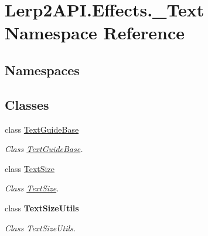 \hypertarget{namespace_lerp2_a_p_i_1_1_effects_1_1___text}{}\section{Lerp2\+A\+P\+I.\+Effects.\+\_\+\+Text Namespace Reference}
\label{namespace_lerp2_a_p_i_1_1_effects_1_1___text}
\subsection*{Namespaces}
\begin{DoxyCompactItemize}
\end{DoxyCompactItemize}
\subsection*{Classes}
\begin{DoxyCompactItemize}
\item 
class \hyperlink{class_lerp2_a_p_i_1_1_effects_1_1___text_1_1_text_guide_base}{Text\+Guide\+Base}
\begin{DoxyCompactList}\small\item\em Class \hyperlink{class_lerp2_a_p_i_1_1_effects_1_1___text_1_1_text_guide_base}{Text\+Guide\+Base}. \end{DoxyCompactList}\item 
class \hyperlink{class_lerp2_a_p_i_1_1_effects_1_1___text_1_1_text_size}{Text\+Size}
\begin{DoxyCompactList}\small\item\em Class \hyperlink{class_lerp2_a_p_i_1_1_effects_1_1___text_1_1_text_size}{Text\+Size}. \end{DoxyCompactList}\item 
class {\bfseries Text\+Size\+Utils}
\begin{DoxyCompactList}\small\item\em Class Text\+Size\+Utils. \end{DoxyCompactList}\end{DoxyCompactItemize}
